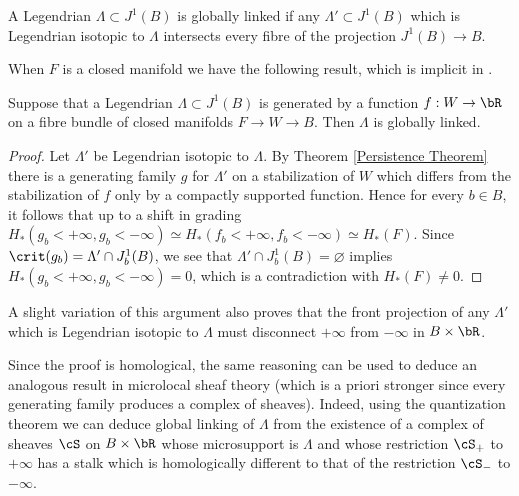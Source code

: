 \begin{definition}
A Legendrian $\Lambda \subset J^1(B)$ is globally linked if any $\Lambda' \subset J^1(B)$ which is Legendrian isotopic to $\Lambda$ intersects every fibre of the projection $J^1(B) \to B$.
\end{definition}

When $F$ is a closed manifold we have the following result, which is implicit in \cite{EG98}.

\begin{proposition}\label{globally linked}
Suppose that a Legendrian $\Lambda \subset J^1(B)$ is generated by a function $f:W \to \bR$ on a fibre bundle of closed manifolds $F \to W \to B$. Then $\Lambda$ is globally linked.
\end{proposition}

\begin{proof}
Let $\Lambda'$ be Legendrian isotopic to $\Lambda$. By Theorem \ref{Persistence Theorem} there is a generating family $g$ for $\Lambda'$ on a stabilization of $W$ which differs from the stabilization of $f$ only by a compactly supported function. Hence for every $b \in B$, it follows that up to a shift in grading $H_*(g_b<+ \infty, g_b<-\infty) \simeq H_*(f_b<+\infty, f_b<-\infty) \simeq H_*(F)$. Since $\crit(g_b) = \Lambda' \cap J^1_b(B)$, we see that $\Lambda' \cap J^1_b(B) = \varnothing$ implies $H_*(g_b<+ \infty, g_b<-\infty)=0$, which is a contradiction with $H_*(F) \neq 0$. \end{proof}

\begin{remark}
A slight variation of this argument also proves that the front projection of any $\Lambda'$ which is Legendrian isotopic to $\Lambda$ must disconnect $+\infty$ from $- \infty$ in $B \times \bR$.
\end{remark}

\begin{remark} Since the proof is homological, the same reasoning can be used to deduce an analogous result in microlocal sheaf theory (which is a priori stronger since every generating family produces a complex of sheaves). Indeed, using the quantization theorem \cite{GKS12} we can deduce global linking of $\Lambda$ from the existence of a complex of sheaves $\cS$ on $B \times \bR$ whose microsupport is $\Lambda$ and whose restriction $\cS_+$ to $+\infty$ has a stalk which is homologically different to that of the restriction $\cS_-$ to $-\infty$.
\end{remark}

